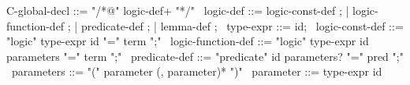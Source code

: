 \begin{syntax}
  C-global-decl ::= "/*@" logic-def+ "*/"
  \
  logic-def ::= logic-const-def ;
          | logic-function-def ;
          | predicate-def ;
          | lemma-def ;
  \
  type-expr ::= id;
  \
  logic-const-def ::= "logic" type-expr id "=" term ";"
  \
  logic-function-def ::= "logic" type-expr id parameters "=" term ";"
  \
  predicate-def ::= "predicate" id parameters? "=" pred ";"
  \
  parameters ::= "(" parameter (, parameter)* ")"
  \
  parameter ::= type-expr id
\end{syntax}
